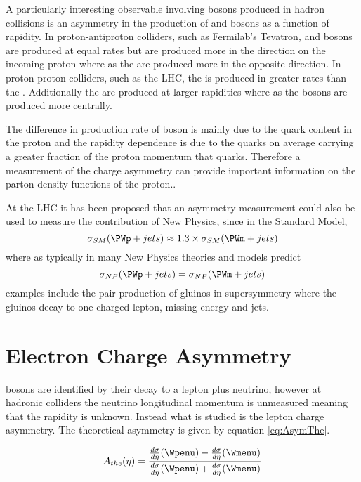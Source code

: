 A particularly interesting observable involving \PW bosons produced in hadron
collisions is an asymmetry in the production of \PWp and \PWm bosons as a
function of rapidity.
In proton-antiproton colliders, such as Fermilab's Tevatron,  \PWp and \PWm
bosons are produced at equal rates but \PWp are produced more in the direction
on the incoming proton where as the \PWm are produced more in the opposite
direction.
In proton-proton colliders, such as the LHC, the \PWp is produced in greater
rates than the \PWm. Additionally the \PWp are produced at larger rapidities
where as the \PWm bosons are produced more centrally. \cite{phenom}

The difference in production rate of \PWpm boson is mainly due to the quark
content in the proton and the rapidity dependence is due to the \Pup quarks on
average carrying a greater fraction of the proton momentum that \Pdown quarks.
Therefore a measurement of the charge asymmetry can provide important
information on the parton density functions of the proton.\cite{phenom,pdf}.

At the LHC it has been proposed \cite{kom} that an asymmetry measurement could
also be used to measure the contribution of New Physics, since in the Standard
Model, \begin{equation}
\sigma_{SM}(\PWp + jets) \approx 1.3 \times \sigma_{SM}(\PWm + jets)
\end{equation}
where as typically in many New Physics theories and models predict
\begin{equation}
\sigma_{NP}(\PWp + jets) = \sigma_{NP}(\PWm + jets)
\end{equation}
examples include the pair production of gluinos in supersymmetry where the
gluinos decay to one charged lepton, missing energy and jets.\cite{kom}

\section{Electron Charge Asymmetry}

\PW bosons are identified by their decay to a lepton plus neutrino, however at
hadronic colliders the neutrino longitudinal momentum is unmeasured meaning
that the \PW rapidity is unknown. Instead what is studied is the lepton charge
asymmetry.\cite{phenom} The theoretical asymmetry is given by equation
\ref{eq:AsymThe}.

\begin{equation}
A_{the}(\eta)=\frac{  \frac{d\sigma}{d\eta}(\Wpenu) -
\frac{d\sigma}{d\eta}(\Wmenu) }{ \frac{d\sigma}{d\eta}(\Wpenu) +
\frac{d\sigma}{d\eta}(\Wmenu) }
\label{eq:AsymThe}
\end{equation} 


